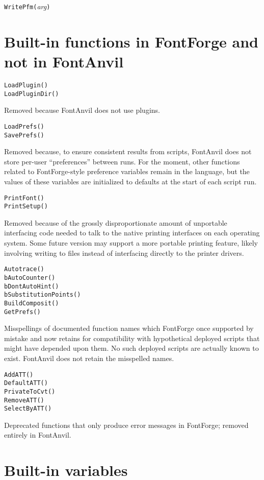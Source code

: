 

\texttt{WritePfm(}\textit{arg}\texttt{)}


\section{Built-in functions in FontForge and not in FontAnvil}

\texttt{LoadPlugin()}\FFdiff\\
\texttt{LoadPluginDir()}

Removed because FontAnvil does not use plugins.

\noindent
\texttt{LoadPrefs()}\FFdiff\\
\texttt{SavePrefs()}

Removed because, to ensure consistent results from scripts, FontAnvil does
not store per-user ``preferences'' between runs.  For the moment, other
functions related to FontForge-style preference variables remain in the
language, but the values of these variables are initialized to defaults at
the start of each script run.

\noindent
\texttt{PrintFont()}\FFdiff\\
\texttt{PrintSetup()}

Removed because of the grossly disproportionate amount of unportable
interfacing code needed to talk to the native printing interfaces on each
operating system.  Some future version may support a more portable printing
feature, likely involving writing to files instead of interfacing directly
to the printer drivers.

\noindent
\texttt{Autotrace()}\FFdiff\\
\texttt{bAutoCounter()}\\
\texttt{bDontAutoHint()}\\
\texttt{bSubstitutionPoints()}\\
\texttt{BuildComposit()}\\
\texttt{GetPrefs()}

Misspellings of documented function names which FontForge once supported by
mistake and now retains for compatibility with hypothetical deployed
scripts that might have depended upon them.  No such deployed scripts are
actually known to exist.  FontAnvil does not retain the misspelled names.

\noindent
\texttt{AddATT()}\FFdiff\\
\texttt{DefaultATT()}\\
\texttt{PrivateToCvt()}\\
\texttt{RemoveATT()}\\
\texttt{SelectByATT()}

Deprecated functions that only produce error messages in FontForge; removed
entirely in FontAnvil.


\section{Built-in variables}

